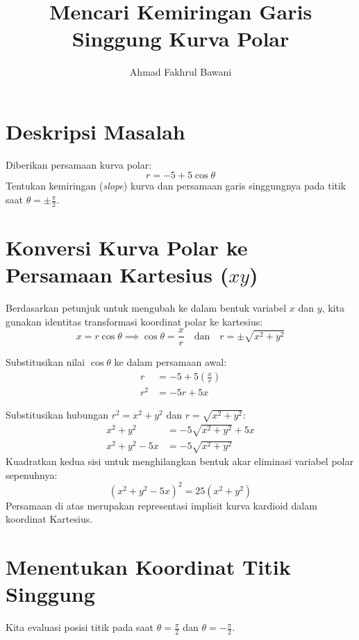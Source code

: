 \documentclass[11pt,a4paper]{article}
\title{\textbf{Mencari Kemiringan Garis Singgung Kurva Polar}}
\author{Ahmad Fakhrul Bawani}
\date{}
\begin{document}
\maketitle

\section{Deskripsi Masalah}
Diberikan persamaan kurva polar:
\begin{equation}
  r = -5 + 5\cos\theta
\end{equation}
Tentukan kemiringan (\textit{slope}) kurva dan persamaan garis singgungnya pada titik saat $\theta = \pm\frac{\pi}{2}$.

\section{Konversi Kurva Polar ke Persamaan Kartesius ($xy$)}
Berdasarkan petunjuk untuk mengubah ke dalam bentuk variabel $x$ dan $y$, kita gunakan identitas transformasi koordinat polar ke kartesius:
\begin{equation*}
  x = r\cos\theta \implies \cos\theta = \frac{x}{r} \quad \text{dan} \quad r = \pm\sqrt{x^2 + y^2}
\end{equation*}

Substitusikan nilai $\cos\theta$ ke dalam persamaan awal:
\begin{align*}
  r &= -5 + 5\left(\frac{x}{r}\right) \\
  r^2 &= -5r + 5x
\end{align*}

Substitusikan hubungan $r^2 = x^2 + y^2$ dan $r = \sqrt{x^2 + y^2}$:
\begin{align*}
  x^2 + y^2 &= -5\sqrt{x^2 + y^2} + 5x \\
  x^2 + y^2 - 5x &= -5\sqrt{x^2 + y^2}
\end{align*}
Kuadratkan kedua sisi untuk menghilangkan bentuk akar eliminasi variabel polar sepenuhnya:
\begin{equation}
  (x^2 + y^2 - 5x)^2 = 25(x^2 + y^2)
\end{equation}
Persamaan di atas merupakan representasi implisit kurva kardioid dalam koordinat Kartesius.

\section{Menentukan Koordinat Titik Singgung}
Kita evaluasi posisi titik pada saat $\theta = \frac{\pi}{2}$ dan $\theta = -\frac{\pi}{2}$.
\end{document}
